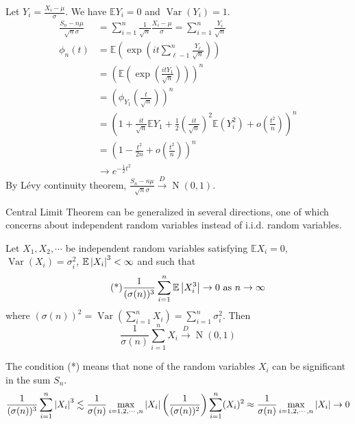 \documentclass{huhtakm-template-book}
\newcommand{\expect}{\mathbb{E}}
\DeclareMathOperator{\N}{N}
\DeclareMathOperator{\Var}{Var}
\begin{document}
\begin{proofing}
    Let $Y_{i}=\frac{X_{i}-\mu}{\sigma}$. We have $\expect Y_{i}=0$ and $\Var(Y_{i})=1$.
    \begin{align*}
        \frac{S_{n}-n\mu}{\sqrt{n}\sigma}&=\sum_{i=1}^{n}\frac{1}{\sqrt{n}}\frac{X_{i}-\mu}{\sigma}=\sum_{i=1}^{n}\frac{Y_{i}}{\sqrt{n}}\\
        \phi_{n}(t)&=\expect\left(\exp\left(it\sum_{\ell-1}^{n}\frac{Y_{\ell}}{\sqrt{n}}\right)\right)\\
        &=\left(\expect\left(\exp\left(\frac{itY_{1}}{\sqrt{n}}\right)\right)\right)^{n}\\
        &=\left(\phi_{Y_{1}}\left(\frac{t}{\sqrt{n}}\right)\right)^{n}\\
        \tag{Taylor expansion}
        &=\left(1+\frac{it}{\sqrt{n}}\expect Y_{1}+\frac{1}{2}\left(\frac{it}{\sqrt{n}}\right)^{2}\expect(Y_{i}^{2})+o\left(\frac{t^{2}}{n}\right)\right)^{n}\\
        &=\left(1-\frac{t^{2}}{2n}+o\left(\frac{t^{2}}{n}\right)\right)^{n}\\
        &\to e^{-\frac{1}{2}t^{2}}
    \end{align*}
    By L\'evy continuity theorem, $\frac{S_{n}-n\mu}{\sqrt{n}\sigma}\xrightarrow{D}\N(0,1)$.
\end{proofing}
Central Limit Theorem can be generalized in several directions, one of which concerns about independent random variables instead of i.i.d. random variables.
\begin{thm}
    Let $X_{1},X_{2},\cdots$ be independent random variables satisfying $\expect X_{i}=0$, $\Var(X_{i})=\sigma_{i}^{2}$, $\expect\abs{X_{i}}^{3}<\infty$ and such that
    \begin{equation*}
        \tag{*}
        \frac{1}{(\sigma(n))^{3}}\sum_{i=1}^{n}\expect\abs{X_{i}^{3}}\to 0 \text{ as }n\to\infty
    \end{equation*}
    where $(\sigma(n))^{2}=\Var(\sum_{i=1}^{n}X_{i})=\sum_{i=1}^{n}\sigma_{i}^{2}$. Then
    \begin{equation*}
        \frac{1}{\sigma(n)}\sum_{i=1}^{n}X_{i}\xrightarrow{D}\N(0,1)
    \end{equation*}
\end{thm}
\begin{rem}
    The condition (*) means that none of the random variables $X_{i}$ can be significant in the sum $S_{n}$.
    \begin{equation*}
        \frac{1}{(\sigma(n))^{3}}\sum_{i=1}^{n}\left|{X_{i}}\right|^{3}\lesssim\frac{1}{\sigma(n)}\max_{i=1,2,\cdots,n}\left|{X_{i}}\right|\left(\frac{1}{(\sigma(n))^{2}}\right)\sum_{i=1}^{n}(X_{i})^{2}\approx\frac{1}{\sigma(n)}\max_{i=1,2,\cdots,n}\left|{X_{i}}\right|\to 0
    \end{equation*}
\end{rem}
\end{document}
